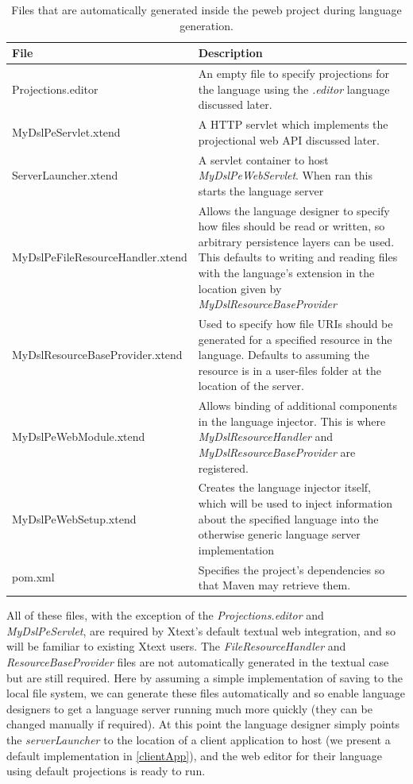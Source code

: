 \documentclass{article}
\begin{document}
\begin{table}[h!]
\centering
\begin{tabular}{| m{7cm} | m{8cm} |}
\hline
File & Description \\
\hline \hline
Projections.editor & An empty file to specify projections for the language using the \emph{.editor} language discussed later.\\
\hline
MyDslPeServlet.xtend & A HTTP servlet which implements the projectional web API discussed later.\\
\hline
ServerLauncher.xtend & A servlet container to host \emph{MyDslPeWebServlet}. When ran this starts the language server \\
\hline
MyDslPeFileResourceHandler.xtend & Allows the language designer to specify how files should be read or written, so arbitrary persistence layers can be used. This defaults to writing and reading files with the language's extension in the location given by  \emph{MyDslResourceBaseProvider} \\
\hline
MyDslResourceBaseProvider.xtend & Used to specify how file URIs should be generated for a specified resource in the language. Defaults to assuming the resource is in a user-files folder at the location of the server.\\
\hline
MyDslPeWebModule.xtend & Allows binding of additional components in the language injector. This is where \emph{MyDslResourceHandler} and \emph{MyDslResourceBaseProvider} are registered.\\
\hline
MyDslPeWebSetup.xtend & Creates the language injector itself, which will be used to inject information about the specified language into the otherwise generic language server implementation\\
\hline
pom.xml & Specifies the project's dependencies so that Maven may retrieve them.\\
\hline
\end{tabular}
\caption{Files that are automatically generated inside the peweb project during language generation.}
\label{Tab:generatedFiles}
\end{table}All of these files, with the exception of the \emph{Projections.editor} and \emph{MyDslPeServlet}, are required by Xtext's default textual web integration, and so will be familiar to existing Xtext users. The \emph{FileResourceHandler} and \emph{ResourceBaseProvider} files are not automatically generated in the textual case but are still required. Here by assuming a simple implementation of saving to the local file system, we can generate these files automatically and so enable language designers to get a language server running much more quickly (they can be changed manually if required). At this point the language designer simply points the \emph{serverLauncher} to the location of a client application to host (we present a default implementation in \ref{clientApp}), and the web editor for their language using default projections is ready to run. 
\end{document}
